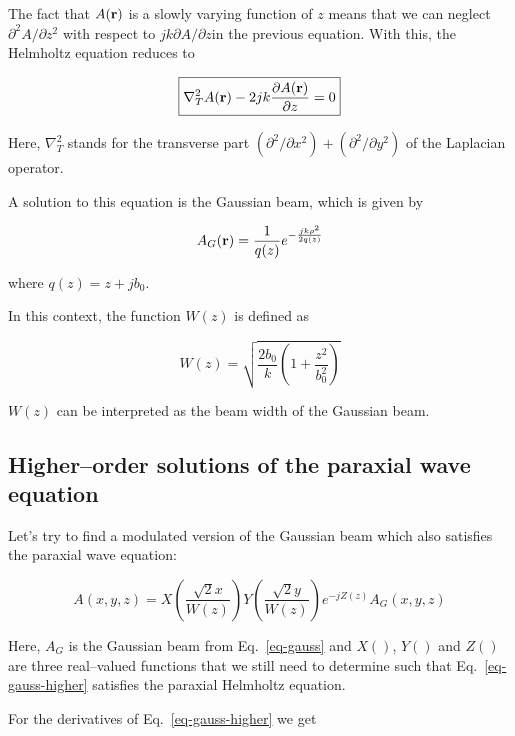 The fact that $A({\bf r})$ is a slowly varying function of $z$ means that we can neglect $\partial^2 A / \partial z^2$ with respect to $j k \partial A / \partial z$in the previous equation. With this, the Helmholtz equation reduces to

\begin{equation}
\fbox{$\displaystyle
\nabla_T^2 A({\bf r}) -2jk \frac{\partial A({\bf r})}{\partial z} = 0
$}
\label{eq-paraxial}
\end{equation} 

Here, $\nabla_T^2$ stands for the transverse part $(\partial^2 / \partial x^2) + (\partial^2 / \partial y^2)$ of the Laplacian operator.

A solution to this equation is the Gaussian beam, which is given by

\begin{equation}
A_G({\bf r}) = \frac{1}{q(z)}e^{-\frac{jk\rho^2}{2q(z)}} \label{eq-gauss}
\end{equation}   

where $q(z)=z+jb_0$. 

In this context, the function $W(z)$ is defined as

\begin{equation}
W(z)=\sqrt{\frac{2 b_0}{k} \left(1 + \frac{z^2}{b_0^2}\right)} \label{eq-W}
\end{equation} 

$W(z)$ can be interpreted as the beam width of the Gaussian beam.

\subsection*{Higher--order solutions of the paraxial wave equation}

Let's try to find a modulated version of the Gaussian beam which also satisfies the paraxial wave equation:

\begin{equation}
A(x,y,z) = X\left({\frac{\sqrt{2}x}{W(z)}}\right) Y\left({\frac{\sqrt{2}y}{W(z)}}\right) e^{-jZ(z)} A_G(x,y,z) \label{eq-gauss-higher}
\end{equation} 

Here, $A_G$ is the Gaussian beam from Eq.~\ref{eq-gauss} and $X()$, $Y()$ and $Z()$ are three real--valued functions that we still need to determine such that Eq.~\ref{eq-gauss-higher} satisfies the paraxial Helmholtz equation.

For the derivatives of Eq.~\ref{eq-gauss-higher} we get

